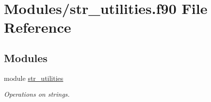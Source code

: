 \hypertarget{str__utilities_8f90}{}\section{Modules/str\+\_\+utilities.f90 File Reference}
\label{str__utilities_8f90}
\subsection*{Modules}
\begin{DoxyCompactItemize}
\item 
module \hyperlink{namespacestr__utilities}{str\+\_\+utilities}
\begin{DoxyCompactList}\small\item\em Operations on strings. \end{DoxyCompactList}\end{DoxyCompactItemize}

